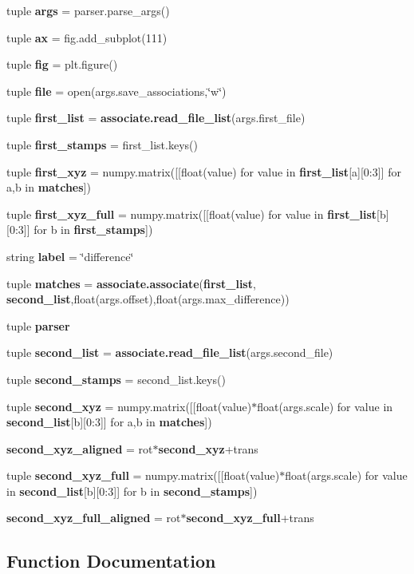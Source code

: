 \begin{DoxyCompactItemize}
\item 
tuple {\bf args} = parser.\-parse\-\_\-args()
\item 
tuple {\bf ax} = fig.\-add\-\_\-subplot(111)
\item 
tuple {\bf fig} = plt.\-figure()
\item 
tuple {\bf file} = open(args.\-save\-\_\-associations,\char`\"{}w\char`\"{})
\item 
tuple {\bf first\-\_\-list} = {\bf associate.\-read\-\_\-file\-\_\-list}(args.\-first\-\_\-file)
\item 
tuple {\bf first\-\_\-stamps} = first\-\_\-list.\-keys()
\item 
tuple {\bf first\-\_\-xyz} = numpy.\-matrix([[float(value) for value in {\bf first\-\_\-list}[a][0\-:3]] for a,b in {\bf matches}])
\item 
tuple {\bf first\-\_\-xyz\-\_\-full} = numpy.\-matrix([[float(value) for value in {\bf first\-\_\-list}[b][0\-:3]] for b in {\bf first\-\_\-stamps}])
\item 
string {\bf label} = \char`\"{}difference\char`\"{}
\item 
tuple {\bf matches} = {\bf associate.\-associate}({\bf first\-\_\-list}, {\bf second\-\_\-list},float(args.\-offset),float(args.\-max\-\_\-difference))
\item 
tuple {\bf parser}
\item 
tuple {\bf second\-\_\-list} = {\bf associate.\-read\-\_\-file\-\_\-list}(args.\-second\-\_\-file)
\item 
tuple {\bf second\-\_\-stamps} = second\-\_\-list.\-keys()
\item 
tuple {\bf second\-\_\-xyz} = numpy.\-matrix([[float(value)$\ast$float(args.\-scale) for value in {\bf second\-\_\-list}[b][0\-:3]] for a,b in {\bf matches}])
\item 
{\bf second\-\_\-xyz\-\_\-aligned} = rot$\ast${\bf second\-\_\-xyz}+trans
\item 
tuple {\bf second\-\_\-xyz\-\_\-full} = numpy.\-matrix([[float(value)$\ast$float(args.\-scale) for value in {\bf second\-\_\-list}[b][0\-:3]] for b in {\bf second\-\_\-stamps}])
\item 
{\bf second\-\_\-xyz\-\_\-full\-\_\-aligned} = rot$\ast${\bf second\-\_\-xyz\-\_\-full}+trans
\end{DoxyCompactItemize}


\subsection{\-Function \-Documentation}
